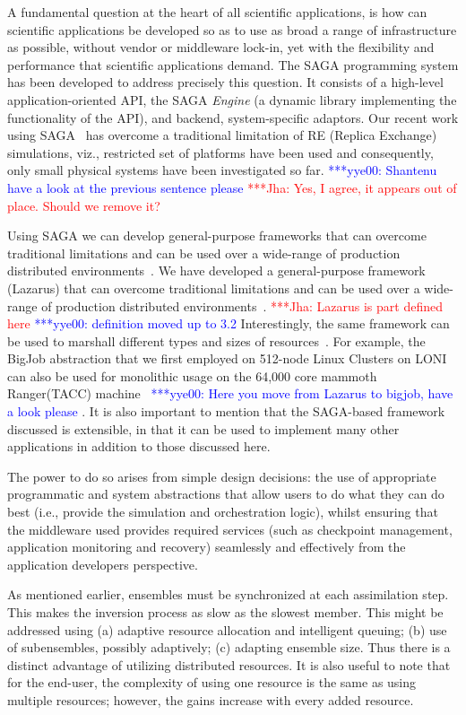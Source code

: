 \documentclass{acm_proc_article-sp}
\newcommand{\jhanote}[1]{ {\textcolor{red} { ***Jha: #1 }}}
\newcommand{\yyenote}[1]{ {\textcolor{blue} { ***yye00: #1 }}}
\newcommand{\jhanote}[1]{}
\newcommand{\yyenote}[1]{}
\begin{document}
A fundamental question at the heart of all scientific applications, is
how can scientific applications be developed so as to use as broad a
range of infrastructure as possible, without vendor or middleware
lock-in, yet with the flexibility and performance that scientific
applications demand. The SAGA programming system has been developed to
address precisely this question. It consists of a high-level
application-oriented API, the SAGA {\it Engine} (a dynamic library
implementing the functionality of the API), and backend,
system-specific adaptors.  Our recent work using
SAGA~\cite{saga-papers} has overcome a traditional limitation of RE
(Replica Exchange) simulations, viz., restricted set of platforms have
been used and consequently, only small physical systems have been
investigated so far.\yyenote{Shantenu have a look at the previous
  sentence please} \jhanote{Yes, I agree, it appears out of
  place. Should we remove it?}

Using SAGA we can develop general-purpose frameworks that can overcome
traditional limitations and can be used over a wide-range of production
distributed environments~\cite{saga-royalsoc}. We have developed a general-purpose
framework (Lazarus) that can overcome traditional
limitations and can be used over a wide-range of production
distributed environments~\cite{saga-royalsoc}.  \jhanote{Lazarus is
  part defined here}\yyenote{definition moved up to 3.2} Interestingly, the same framework can be used to
marshall different types and sizes of
resources~\cite{saga-papers}. For example, the BigJob abstraction that
we first employed on 512-node Linux Clusters on LONI can also be used
for monolithic usage on the 64,000 core mammoth Ranger(TACC)
machine~\cite{saga-iccs09}\yyenote{Here you move from Lazarus to bigjob, have a look please}.
It is also important to mention that the
SAGA-based framework discussed is extensible, in that it can be used
to implement many other applications in addition to those discussed
here.

The power to do so arises from simple design decisions: the use of
appropriate programmatic and system abstractions that allow users to
do what they can do best (i.e., provide the simulation and
orchestration logic), whilst ensuring that the middleware used
provides required services (such as checkpoint management, application
monitoring and recovery) seamlessly and effectively from the
application developers perspective. 

As mentioned earlier, ensembles must be synchronized at each
assimilation step. This makes the inversion process as slow as the
slowest member. This might be addressed using (a) adaptive resource
allocation and intelligent queuing; (b) use of subensembles, possibly
adaptively; (c) adapting ensemble size.  Thus there is a distinct
advantage of utilizing distributed resources.  It is also useful to
note that for the end-user, the complexity of using one resource is
the same as using multiple resources; however, the gains increase with
every added resource.
\end{document}

